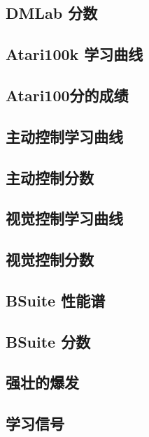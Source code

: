 \clearpage
\subsection*{DMLab 分数}


\clearpage
\subsection*{Atari100k 学习曲线}


\clearpage
\subsection*{Atari100分的成绩}



\clearpage
\subsection*{主动控制学习曲线}


\clearpage
\subsection*{主动控制分数}


\clearpage
\subsection*{视觉控制学习曲线}


\clearpage
\subsection*{视觉控制分数}


\clearpage
\subsection*{BSuite 性能谱}


\clearpage
\subsection*{BSuite 分数}


\clearpage
\subsection*{强壮的爆发}


\clearpage
\subsection*{学习信号}

